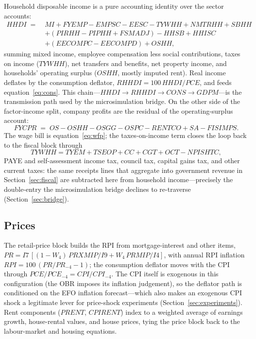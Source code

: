 Household disposable income is a pure accounting identity over the sector accounts:
\begin{equation}
\begin{aligned}
HHDI \;=\;& MI + FYEMP - EMPSC - EESC - TYWHH + NMTRHH + SBHH \\
&+ (PIRHH - PIPHH + FSMADJ) - HHSB + HHISC \\
&+ (EECOMPC - EECOMPD) + OSHH,
\end{aligned}
\label{eq:hhdi}
\end{equation}
summing mixed income, employee compensation less social contributions, taxes on income ($TYWHH$), net transfers and benefits, net property income, and households' operating surplus ($OSHH$, mostly imputed rent). Real income deflates by the consumption deflator, $RHHDI = 100\,HHDI/PCE$, and feeds equation~\eqref{eq:cons}. This chain---$HHDI \to RHHDI \to CONS \to GDPM$---is the transmission path used by the microsimulation bridge. On the other side of the factor-income split, company profits are the residual of the operating-surplus account:
\begin{equation}
FYCPR \;=\; OS - OSHH - OSGG - OSPC - RENTCO + SA - FISIMPS.
\label{eq:fycpr}
\end{equation}
The wage bill is equation~\eqref{eq:wfp}; the taxes-on-income term closes the loop back to the fiscal block through
\begin{equation}
TYWHH = TYEM + TSEOP + CC + CGT + OCT - NPISHTC,
\label{eq:tywhh}
\end{equation}
PAYE and self-assessment income tax, council tax, capital gains tax, and other current taxes: the same receipts lines that aggregate into government revenue in Section~\ref{sec:fiscal} are subtracted here from household income---precisely the double-entry the microsimulation bridge declines to re-traverse (Section~\ref{sec:bridge}).

\subsection{Prices}

The retail-price block builds the RPI from mortgage-interest and other items, $PR = I7\,[(1-W_4)\,PRXMIP/I9 + W_4\,PRMIP/I4]$, with annual RPI inflation $RPI = 100\,(PR/PR_{-4} - 1)$; the consumption deflator moves with the CPI through $PCE/PCE_{-4} = CPI/CPI_{-4}$. The CPI itself is exogenous in this configuration (the OBR imposes its inflation judgement), so the deflator path is conditioned on the EFO inflation forecast---which also makes an exogenous CPI shock a legitimate lever for price-shock experiments (Section~\ref{sec:experiments}). Rent components ($PRENT$, $CPIRENT$) index to a weighted average of earnings growth, house-rental values, and house prices, tying the price block back to the labour-market and housing equations.

